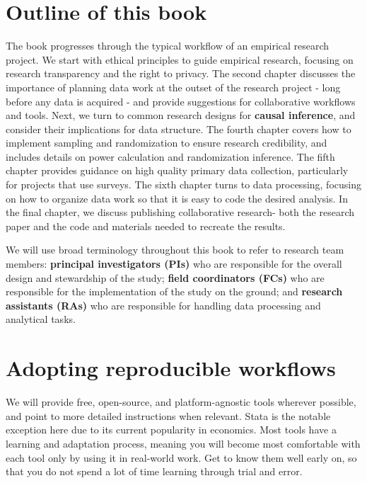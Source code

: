 \section{Outline of this book}
The book progresses through the typical workflow of an empirical research project.
We start with ethical principles to guide empirical research, 
focusing on research transparency and the right to privacy. 
The second chapter discusses the importance of planning data work at the outset of the research project - 
long before any data is acquired - and provide suggestions for collaborative workflows and tools. 
Next, we turn to common research designs for \textbf{causal inference}{}, and consider their implications for data structure. 
The fourth chapter covers how to implement sampling and randomization to ensure research credibility, 
and includes details on power calculation and randomization inference. 
The fifth chapter provides guidance on high quality primary data collection, particularly for projects that use surveys. 
The sixth chapter turns to data processing, 
focusing on how to organize data work so that it is easy to code the desired analysis. 
In the final chapter, we discuss publishing collaborative research- 
both the research paper and the code and materials needed to recreate the results.  

We will use broad terminology throughout this book to refer to research team members:
\textbf{principal investigators (PIs)} who are responsible for
the overall design and stewardship of the study;
\textbf{field coordinators (FCs)} who are responsible for
the implementation of the study on the ground;
and \textbf{research assistants (RAs)} who are responsible for
handling data processing and analytical tasks.


\section{Adopting reproducible workflows}
We will provide free, open-source, and platform-agnostic tools wherever possible,
and point to more detailed instructions when relevant.
Stata is the notable exception here due to its current popularity in economics.
Most tools have a learning and adaptation process,
meaning you will become most comfortable with each tool
only by using it in real-world work.
Get to know them well early on,
so that you do not spend a lot of time learning through trial and error.

